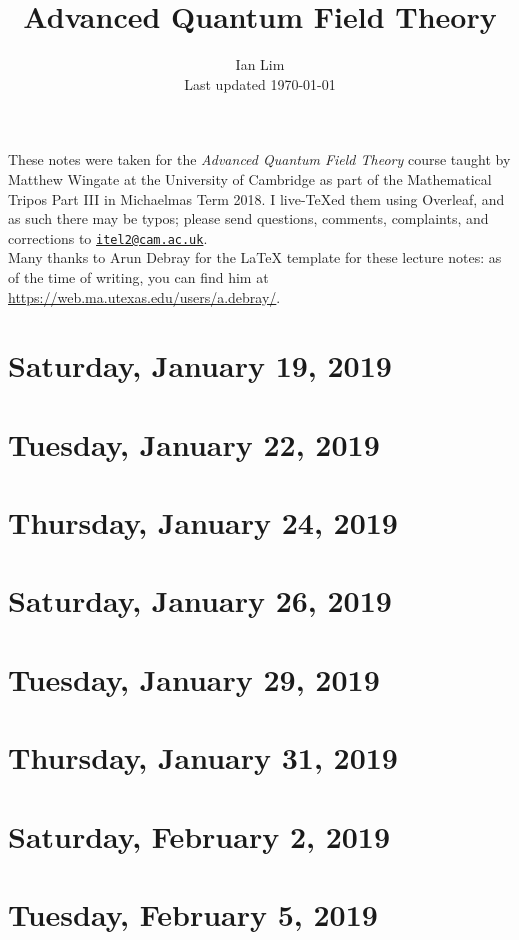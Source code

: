 \documentclass[reqno]{amsart}
\begin{document}
\title{Advanced Quantum Field Theory}
\author{Ian Lim\\ Last updated \today}
\maketitle
{\small\noindent These notes were taken for the \textit{Advanced Quantum Field Theory} course taught by Matthew Wingate at the University of Cambridge as part of the Mathematical Tripos Part III in Michaelmas Term 2018. I live-\TeX ed them using Overleaf, and as such there may be typos; please send questions, comments, complaints, and corrections to 
\href{mailto:itel2@cam.ac.uk?subject=AQFT\%20Lecture\%20Notes}{\texttt{itel2@cam.ac.uk}}.\\
Many thanks to Arun Debray for the {\LaTeX} template for these lecture notes: as of the time of writing, you can find him at \url{https://web.ma.utexas.edu/users/a.debray/}.}

\tableofcontents

\section{Saturday, January 19, 2019}
	

\section{Tuesday, January 22, 2019}
	

\section{Thursday, January 24, 2019}
    
    
\section{Saturday, January 26, 2019}
    

\section{Tuesday, January 29, 2019}
    

\section{Thursday, January 31, 2019}
    

\section{Saturday, February 2, 2019}
    
    
\section{Tuesday, February 5, 2019}
    
\end{document}
